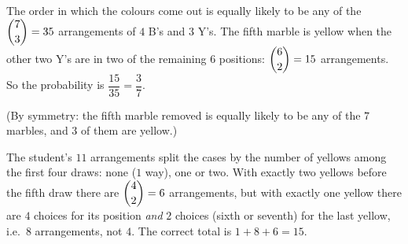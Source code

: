 The order in which the colours come out is equally likely to be any of the $\dbinom73=35$ arrangements of $4$ B's and $3$ Y's. The fifth marble is yellow when the other two Y's are in two of the remaining $6$ positions: $\dbinom62=15$ arrangements. So the probability is $\dfrac{15}{35}=\boxed{\dfrac{3}{7}}$.

(By symmetry: the fifth marble removed is equally likely to be any of the $7$ marbles, and $3$ of them are yellow.)

The student's $11$ arrangements split the cases by the number of yellows among the first four draws: none ($1$ way), one or two. With exactly two yellows before the fifth draw there are $\dbinom42=6$ arrangements, but with exactly one yellow there are $4$ choices for its position \emph{and} $2$ choices (sixth or seventh) for the last yellow, i.e.\ $8$ arrangements, not $4$. The correct total is $1+8+6=15$.
